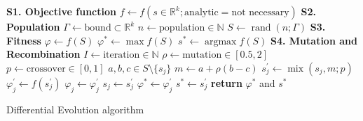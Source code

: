 \documentclass[a4paper,10pt]{article}
\begin{document}
	\begin{algorithm}[ht]
		\begin{algorithmic}\vspace{0.2em}
			\State \textbf{S1. Objective function}
			\State $f \gets f(s\in\mathbb{R}^{k}; \text{analytic} = \text{not necessary})$\vspace{0.7em}
			\State \textbf{S2. Population}
			\State $\Gamma \gets \text{bound}\subset\mathbb{R}^{k}$ 
			\State $n \gets \text{population}\in\mathbb{N}$ 
			\State $S \gets \operatorname{rand}(n;\Gamma)$ \vspace{0.7em}
			\State \textbf{S3. Fitness}
			\State $\varphi \gets f(S)$ 
			\State $\varphi^{*} \gets \max{f(S)}$ 
			\State $s^{*} \gets \operatorname{argmax}{f(S)}$\vspace{0.7em}
			\State \textbf{S4. Mutation and Recombination}
			\State $I \gets \text{iteration} \in \mathbb{N}$ 
			\State $\rho \gets \text{mutation} \in [0.5,2]$ 
			\State $p \gets \text{crossover} \in [0,1]$ 
					\State $a,b,c \in S\setminus\{s_{j}\}$
					\State $m \gets a + \rho (b - c)$ 
					\State $s^{\prime}_{j} \gets \operatorname{mix}(s_{j},m;p)$ 
					\State $\varphi^{\prime}_{j} \gets f(s^{\prime}_{j})$ 
					 
						\State $\varphi_{j} \gets \varphi^{\prime}_{j}$
						\State $s_{j} \gets s^{\prime}_{j}$
					\EndIf
					 
						\State $\varphi^{*} \gets \varphi^{\prime}_{j}$
						\State $s^{*} \gets s^{\prime}_{j}$
					\EndIf
				\EndFor
			\EndFor
			\State \textbf{return} $\varphi^{*}$ and $s^{*}$ 
		\end{algorithmic}
		\caption{Differential Evolution algorithm}\label{DE}
	\end{algorithm}

\end{document}
